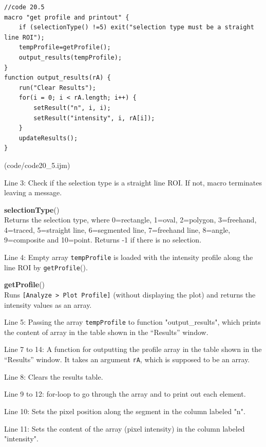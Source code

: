 \documentclass[11pt,a4paper,oneside]{report}
\newenvironment{indentCom}
{\begin{list}{}
         {\setlength{\leftmargin}{1em}}
         \item[]
}
{\end{list}}
\newcommand{\ijmenu}[1]{\texttt{\small#1}}
\newcommand{\ilcom}[1]{\texttt{\small#1}}
\begin{document}
\begin{lstlisting}[morekeywords={*, newArray, selectionType, getProfile, setResult, updateResults}]
//code 20.5
macro "get profile and printout" {
	if (selectionType() !=5) exit("selection type must be a straight line ROI");
	tempProfile=getProfile();
	output_results(tempProfile);
} 
function output_results(rA) {
	run("Clear Results");
	for(i = 0; i < rA.length; i++) { 
		setResult("n", i, i);
		setResult("intensity", i, rA[i]);
	}
	updateResults();
}
\end{lstlisting}
(code/code20_5.ijm)

\begin{itemize}
\item Line 3: Check if the selection type is a straight line ROI. If not, macro terminates leaving a message. 

\begin{indentCom}
\textbf{selectionType}()\\ 
Returns the selection type, where 0=rectangle, 1=oval, 2=polygon, 3=freehand, 4=traced, 5=straight line, 6=segmented line, 7=freehand line, 8=angle, 9=composite and 10=point. Returns -1 if there is no selection.
\end{indentCom}

\item Line 4: Empty array \ilcom{tempProfile} is loaded with the intensity profile along the line ROI by \ilcom{getProfile}().
\item
\begin{indentCom}
\textbf{getProfile}()\\
Runs \ijmenu{[Analyze > Plot Profile]} (without displaying the plot) and returns the intensity values as an array.
\end{indentCom}

\item Line 5: Passing the array \ilcom{tempProfile} to function "output\_results", which prints the content of array in the table shown in the ``Results'' window. 

\item Line 7 to 14: A function for outputting the profile array in the table shown in the ``Results'' window. It takes an argument \ilcom{rA}, which is supposed to be an array. 
\item Line 8: Clears the results table. 
\item Line 9 to 12: for-loop to go through the array and to print out each element. 
\item Line 10: Sets the pixel position along the segment in the column labeled "n". 
\item Line 11: Sets the content of the array (pixel intensity) in the column labeled "intensity".


\end{itemize}
\end{document}
